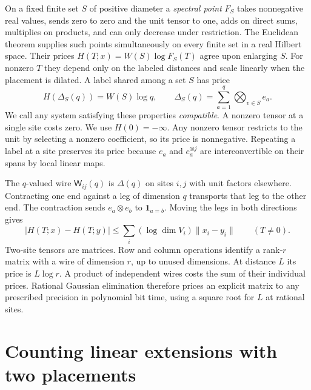 \documentclass[11pt,letterpaper]{article}
\theoremstyle{definition}
\newcommand{\norm}[1]{\lVert#1\rVert}
\newcommand{\wire}{\mathsf W}
\begin{document}
On a fixed finite set \(S\) of positive diameter a \emph{spectral point}
\(F_S\) takes nonnegative real values, sends zero to zero and the unit
tensor to one, adds on direct sums, multiplies on products, and can only
decrease under restriction. The Euclidean theorem supplies such points
simultaneously on every finite set in a real Hilbert space. Their prices
\(H(T;x)=W(S)\log F_S(T)\) agree upon enlarging \(S\). For nonzero \(T\)
they depend only on the labeled distances and scale linearly when the
placement is dilated. A label shared among a set \(S\) has price
\begin{equation}
 H(\Delta_S(q))=W(S)\log q,\qquad
 \Delta_S(q)=\sum_{a=1}^q\bigotimes_{v\in S} e_a .
 \label{eq:diagonal}
\end{equation}
We call any system satisfying these properties \emph{compatible}. A
nonzero tensor at a single site costs zero. We use \(H(0)=-\infty\).
Any nonzero tensor restricts to the unit by selecting a nonzero coefficient,
so its price is nonnegative. Repeating a label at a site preserves its price
because \(e_a\) and \(e_a^{\otimes j}\) are interconvertible on their
spans by local linear maps. \cite[Theorem~1.1]{euclid}

The \(q\)-valued wire \(\wire_{ij}(q)\) is \(\Delta(q)\) on sites \(i,j\)
with unit factors elsewhere. Contracting one end against a leg of
dimension \(q\) transports that leg to the other end. The contraction sends
\(e_a\otimes e_b\) to \(\mathbf1_{a=b}\). Moving the legs in both directions gives
\begin{equation}
 |H(T;x)-H(T;y)|\le\sum_i(\log\dim V_i)\norm{x_i-y_i}\qquad(T\ne0).
 \label{eq:transport}
\end{equation}
Two-site tensors are matrices. Row and column operations identify a
rank-\(r\) matrix with a wire of dimension \(r\), up to unused dimensions.
At distance \(L\) its price is \(L\log r\). A product of independent wires
costs the sum of their individual prices. Rational Gaussian elimination
therefore prices an explicit matrix to any prescribed precision in
polynomial bit time, using a square root for \(L\) at rational sites.

\section{Counting linear extensions with two placements}
\label{sec:count}
\end{document}
